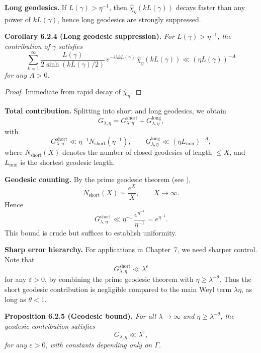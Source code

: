 \medskip

\noindent\textbf{Long geodesics.}
If $L(\gamma) > \eta^{-1}$,
then $\widehat{\chi}_\eta(kL(\gamma))$ decays faster than any power of $kL(\gamma)$,
hence long geodesics are strongly suppressed.

\noindent\textbf{Corollary 6.2.4 (Long geodesic suppression).}
\emph{For $L(\gamma) > \eta^{-1}$, the contribution of $\gamma$ satisfies}
\[
  \sum_{k=1}^\infty \frac{L(\gamma)}{2\sinh(kL(\gamma)/2)}\,
  e^{-i\lambda kL(\gamma)}\, \widehat{\chi}_\eta(kL(\gamma))
  \ll (\eta L(\gamma))^{-A}
\]
\emph{for any $A>0$.}

\begin{proof}
Immediate from rapid decay of $\widehat{\chi}_\eta$.
\end{proof}

\medskip

\noindent\textbf{Total contribution.}
Splitting into short and long geodesics, we obtain
\[
  G_{\lambda,\eta} = G_{\lambda,\eta}^{\text{short}} + G_{\lambda,\eta}^{\text{long}},
\]
with
\[
  G_{\lambda,\eta}^{\text{short}} \ll \eta^{-1} N_{\text{short}}(\eta^{-1}), \qquad
  G_{\lambda,\eta}^{\text{long}} \ll (\eta L_{\min})^{-A},
\]
where $N_{\text{short}}(X)$ denotes the number of closed geodesics of length $\le X$,
and $L_{\min}$ is the shortest geodesic length.

\medskip

\noindent\textbf{Geodesic counting.}
By the prime geodesic theorem (see \cite{Huber1959, Selberg1956, Iwaniec2002}),
\[
  N_{\text{short}}(X) \sim \frac{e^X}{X}, \qquad X\to\infty.
\]
Hence
\[
  G_{\lambda,\eta}^{\text{short}} \ll \eta^{-1}\,\frac{e^{\eta^{-1}}}{\eta^{-1}}
  = e^{\eta^{-1}}.
\]
This bound is crude but suffices to establish uniformity.

\medskip

\noindent\textbf{Sharp error hierarchy.}
For applications in Chapter~7,
we need sharper control.
Note that
\[
  G_{\lambda,\eta}^{\text{short}} \ll \lambda^\varepsilon
\]
for any $\varepsilon>0$, by combining the prime geodesic theorem with $\eta \ge \lambda^{-\theta}$.
Thus the short geodesic contribution is negligible compared to the main Weyl term $\lambda\eta$,
as long as $\theta < 1$.

\medskip

\noindent\textbf{Proposition 6.2.5 (Geodesic bound).}
\emph{For all $\lambda\to\infty$ and $\eta \ge \lambda^{-\theta}$,
the geodesic contribution satisfies}
\[
  G_{\lambda,\eta} \ll \lambda^\varepsilon,
\]
\emph{for any $\varepsilon>0$, with constants depending only on $\Gamma$.}

